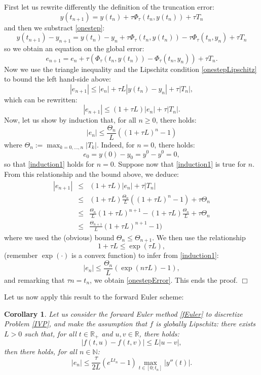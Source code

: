 \documentclass{article}
\newtheorem{cor}{Corollary}
\begin{document}
 First let us rewrite differently the definition of the truncation error:
\[
y(t_{n+1}) = y(t_n) + \tau \Phi_\tau ( t_n , y(t_n) ) + \tau T_n
\]
and then we substract \eqref{onestep}:
\[
y(t_{n+1}) - y_{n+1} = y(t_n) - y_n + \tau \Phi_\tau ( t_n , y(t_n) ) - \tau \Phi_\tau ( t_n , y_n ) + \tau T_n
\]
so we obtain an equation on the global error:
\[
e_{n+1} = e_n + \tau \left ( \Phi_\tau ( t_n , y(t_n) ) - \Phi_\tau ( t_n , y_n ) \right ) + \tau T_n.
\]
Now we use the triangle inequality and the Lipschitz condition \eqref{onestepLipschitz} to bound the left hand-side above:
\[
|e_{n+1}| \leq |e_n| + \tau L \left | y(t_n) - y_n  \right | + \tau |T_n|,
\]
which can be rewritten:
\[
|e_{n+1}| \leq (1 + \tau L ) |e_n| + \tau |T_n|.
\]
Now, let us show by induction that, for all $n\geq0$, there holds:
\begin{equation} \label{induction1}
|e_n| \leq \frac{\Theta_n}{L}
\left (
(1 + \tau L )^n - 1
\right )
\end{equation}
where $\Theta_n := \max_{k=0,\ldots,n} |T_k|$. Indeed, for $n=0$, there holds:
\[
e_0 = y(0) - y_0 = y^0 - y^0 = 0,
\]
so that \eqref{induction1} holds for $n=0$.
Suppose now that \eqref{induction1} is true for $n$.
From this relationship and the bound above, we deduce:
\begin{eqnarray*}
|e_{n+1}| &\leq& (1 + \tau L ) |e_n| + \tau |T_n|\\
& \leq & (1 + \tau L )
\frac{\Theta_n}{L}
\left (
(1 + \tau L )^n - 1
\right ) + \tau \Theta_n\\
& \leq & 
\frac{\Theta_n}{L}
(1 + \tau L )^{n+1} 
-
(1 + \tau L )
\frac{\Theta_n}{L}
+ \tau \Theta_n\\
& \leq & 
\frac{\Theta_{n+1}}{L}
(1 + \tau L )^{n+1} 
- 1)
\end{eqnarray*}
where we used the (obvious) bound $\Theta_n \leq \Theta_{n+1}$.
We then use the relationship
\[
1 + \tau L \leq \exp ( \tau L),
\]
(remember $\exp(\cdot)$ is a convex function) to infer from \eqref{induction1}:
\[
|e_n| \leq \frac{\Theta_n}{L}
\left (
\exp ( n \tau L ) - 1
\right ),
\]
and remarking that $\tau n = t_n$, we obtain \eqref{onestepError}. This ends the proof.
$\Box$

\medskip

Let us now apply this result to the forward Euler scheme:

\begin{cor} \label{corbEuler}
Let us consider the forward Euler method \eqref{fEuler} to discretize Problem \eqref{IVP}, and make the assumption that $f$ is globally Lipschitz: there exists $L > 0$ such that, for all $t\in\mathbb{R}_+$ and $u,v \in \mathbb{R}$, there holds:
\begin{equation} \label{fLipschitz}
| f ( t , u ) - f ( t , v ) |
\leq L |u-v|,
\end{equation}
then there holds, for all $n \in \mathbb{N}$:
\begin{equation} \label{fEulerError}
|e_n| \leq \frac{\tau}{2L} \left (
e^{Lt_n} - 1
\right ) \max_{t\in[0;t_n]} |y''(t)|.
\end{equation}
\end{cor}
\end{document}
